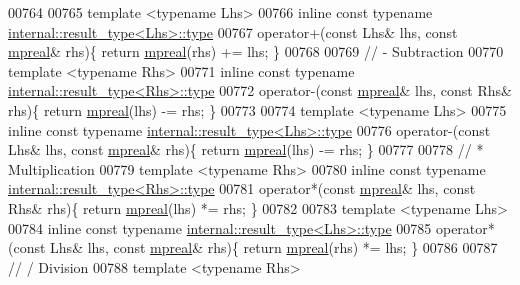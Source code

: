 \begin{DoxyCode}
00764 
00765 \textcolor{keyword}{template} <\textcolor{keyword}{typename} Lhs>
00766 \textcolor{keyword}{inline} \textcolor{keyword}{const} \textcolor{keyword}{typename} \hyperlink{structmpfr_1_1internal_1_1result__type}{internal::result\_type<Lhs>::type}
00767     operator+(\textcolor{keyword}{const} Lhs& lhs, \textcolor{keyword}{const} \hyperlink{classmpfr_1_1mpreal}{mpreal}& rhs)\{ \textcolor{keywordflow}{return} \hyperlink{classmpfr_1_1mpreal}{mpreal}(rhs) += lhs;    \}
00768 
00769 \textcolor{comment}{// - Subtraction}
00770 \textcolor{keyword}{template} <\textcolor{keyword}{typename} Rhs>
00771 \textcolor{keyword}{inline} \textcolor{keyword}{const} \textcolor{keyword}{typename} \hyperlink{structmpfr_1_1internal_1_1result__type}{internal::result\_type<Rhs>::type}
00772     operator-(\textcolor{keyword}{const} \hyperlink{classmpfr_1_1mpreal}{mpreal}& lhs, \textcolor{keyword}{const} Rhs& rhs)\{ \textcolor{keywordflow}{return} \hyperlink{classmpfr_1_1mpreal}{mpreal}(lhs) -= rhs;    \}
00773 
00774 \textcolor{keyword}{template} <\textcolor{keyword}{typename} Lhs>
00775 \textcolor{keyword}{inline} \textcolor{keyword}{const} \textcolor{keyword}{typename} \hyperlink{structmpfr_1_1internal_1_1result__type}{internal::result\_type<Lhs>::type}
00776     operator-(\textcolor{keyword}{const} Lhs& lhs, \textcolor{keyword}{const} \hyperlink{classmpfr_1_1mpreal}{mpreal}& rhs)\{ \textcolor{keywordflow}{return} \hyperlink{classmpfr_1_1mpreal}{mpreal}(lhs) -= rhs;    \}
00777 
00778 \textcolor{comment}{// * Multiplication}
00779 \textcolor{keyword}{template} <\textcolor{keyword}{typename} Rhs>
00780 \textcolor{keyword}{inline} \textcolor{keyword}{const} \textcolor{keyword}{typename} \hyperlink{structmpfr_1_1internal_1_1result__type}{internal::result\_type<Rhs>::type}
00781     operator*(\textcolor{keyword}{const} \hyperlink{classmpfr_1_1mpreal}{mpreal}& lhs, \textcolor{keyword}{const} Rhs& rhs)\{ \textcolor{keywordflow}{return} \hyperlink{classmpfr_1_1mpreal}{mpreal}(lhs) *= rhs;    \}
00782 
00783 \textcolor{keyword}{template} <\textcolor{keyword}{typename} Lhs>
00784 \textcolor{keyword}{inline} \textcolor{keyword}{const} \textcolor{keyword}{typename} \hyperlink{structmpfr_1_1internal_1_1result__type}{internal::result\_type<Lhs>::type}
00785     operator*(\textcolor{keyword}{const} Lhs& lhs, \textcolor{keyword}{const} \hyperlink{classmpfr_1_1mpreal}{mpreal}& rhs)\{ \textcolor{keywordflow}{return} \hyperlink{classmpfr_1_1mpreal}{mpreal}(rhs) *= lhs;    \}
00786 
00787 \textcolor{comment}{// / Division}
00788 \textcolor{keyword}{template} <\textcolor{keyword}{typename} Rhs>

\end{DoxyCode}
